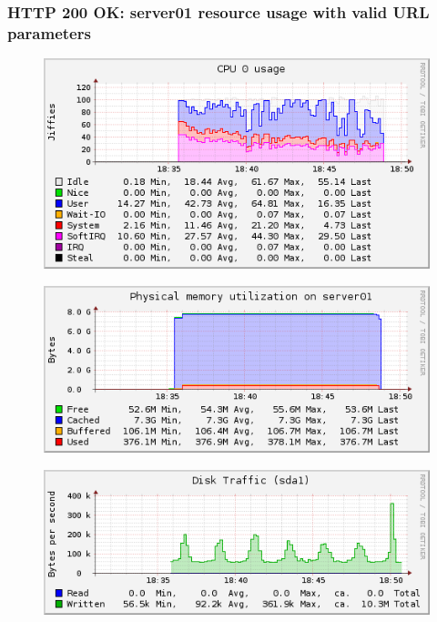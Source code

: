 \documentclass[Measurement results]{subfiles}
\begin{document}
\subsubsection{HTTP 200 OK: server01 resource usage with valid URL parameters}
\begin{figure}[H]
\centering
\includegraphics[scale=0.7]{images/results/200_with_naxsi_incremented_allowed_parameters/cpu.png}
\end{figure}

\begin{figure}[H]
\centering
\includegraphics[scale=0.7]{images/results/200_with_naxsi_incremented_allowed_parameters/memory.png}
\end{figure}

\begin{figure}[H]
\centering
\includegraphics[scale=0.7]{images/results/200_with_naxsi_incremented_allowed_parameters/disk.png}
\end{figure}
\end{document}
